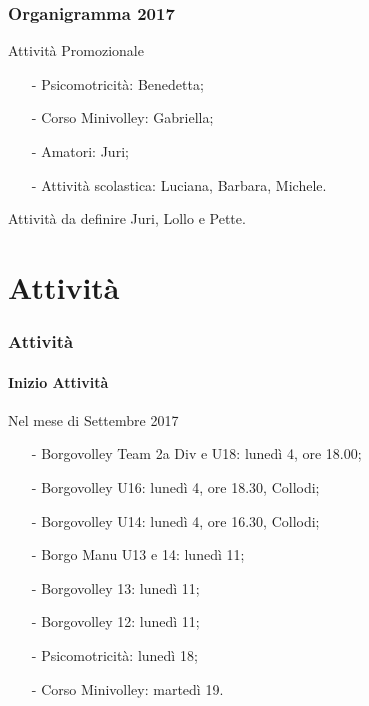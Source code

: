 \documentclass{beamer}
\begin{document}
\begin{frame}
\frametitle{Organigramma 2017}
\begin{block}{Attività Promozionale}
\begin{itemize}
\item[-]Psicomotricità: Benedetta;
\item[-]Corso Minivolley: Gabriella;
\item[-]Amatori: Juri;
\item[-]Attività scolastica: Luciana, Barbara, Michele.
\end{itemize}
\end{block}

\begin{block}{Attività da definire}
Juri, Lollo e Pette.
\end{block}
\end{frame}


\section{Attività}


\begin{frame}
\frametitle{Attività}
\framesubtitle{Inizio Attività}
\begin{block}{Nel mese di Settembre 2017}
\begin{itemize}
\item[-]Borgovolley Team 2a Div e U18: lunedì 4, ore 18.00;
\item[-]Borgovolley U16: lunedì 4, ore 18.30, Collodi;
\item[-]Borgovolley U14: lunedì 4, ore 16.30, Collodi;
\item[-]Borgo Manu U13 e 14: lunedì 11;
\item[-]Borgovolley 13: lunedì 11;
\item[-]Borgovolley 12: lunedì 11;
\item[-]Psicomotricità: lunedì 18;
\item[-]Corso Minivolley: martedì 19.
\end{itemize}
\end{block}
\end{frame}
\end{document}
